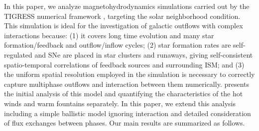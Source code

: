 \documentclass[twocolumn]{aastex62}
\begin{document}
In this paper, we analyze magnetohydrodynamics simulations carried out by the TIGRESS numerical framework \citep{Kim&Ostriker17}, targeting the solar neighborhood condition. This simulation is ideal for the investigation of galactic outflows with complex interactions because: (1) it covers long time evolution and many star formation/feedback and outflow/inflow cycles; (2) star formation rates are self-regulated and SNe are placed in star clusters and runaways, giving self-consistent spatio-temporal correlations of feedback sources and surrounding ISM; and (3) the uniform spatial resolution employed in the simulation is necessary to correctly capture multiphase outflows and interaction between them numerically.
\citet{Kim&Ostriker18} presents the initial analysis of this model and quantifying the characteristics of the hot winds and warm fountains separately. In this paper, we extend this analysis including a simple ballistic model ignoring interaction and detailed consideration of flux exchanges between phases. Our main results are summarized as follows.
\end{document}
